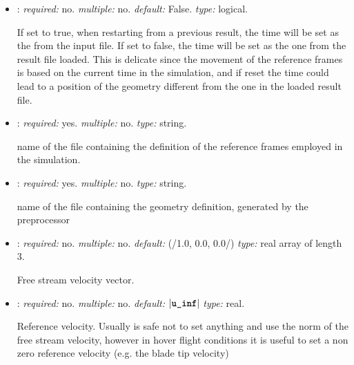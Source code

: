 \begin{itemize}
name of the solution file from which to restart the simulation.

Note: when reloading a certain result, the solver will attempt to load also the 
relative geometry file in the same location, as discussed in \ref{sec:Solver_Output_Files}. 
If such geometry file is not provided the solver, as in the case of standard starting, 
will attempt to generate such file with the default preprocessor input. Beware that in 
this case, if the geometry of the results from which the solver is starting was generated 
from another geometry input this could lead to unexpected behavior.


\item {}: \textit{required:} no. \textit{multiple:} no. \textit{default:} 
False. \textit{type:} logical.

If set to true, when restarting from a previous result, the time will be set as the 
 from the input file. If set to false, the time will be set as the one 
from the result file loaded. This is delicate since the movement of the reference 
frames is based on the current time in the simulation, and if reset the time could 
lead to a position of the geometry different from the one in the loaded result file.


\item {}: \textit{required:} yes. \textit{multiple:} no. 
\textit{type:} string.

name of the file containing the definition of the reference frames employed 
in the simulation.


\item {}: \textit{required:} yes. \textit{multiple:} no. 
\textit{type:} string.

name of the file containing the geometry definition, generated by the preprocessor


\item {}: \textit{required:} no. \textit{multiple:} no. 
\textit{default:} (/1.0, 0.0, 0.0/) \textit{type:} real array of length 3.

Free stream velocity vector.

\item {}: \textit{required:} no. \textit{multiple:} no. 
\textit{default:} $|\text{\textbf{\texttt{u\_inf}}}|$ \textit{type:} real.

Reference velocity. Usually is safe not to set anything and use the norm 
of the free stream velocity, however in hover flight conditions it is useful 
to set a non zero reference velocity (e.g. the blade tip velocity)



\end{itemize}
